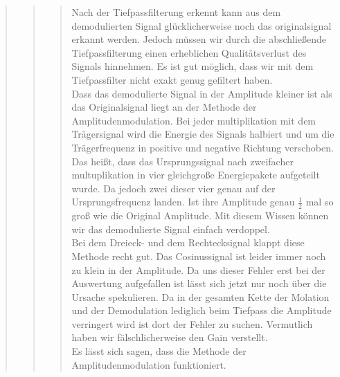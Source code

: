 \begin{quote}
\begin{quote}
\begin{quote}
                    Nach der Tiefpassfilterung erkennt kann aus dem demodulierten Signal glücklicherweise noch das
                    originalsignal erkannt werden. Jedoch müssen wir durch die abschließende Tiefpassfilterung einen
                    erheblichen Qualitätsverlust des Signals hinnehmen. Es ist gut möglich, dass wir mit dem
                    Tiefpassfilter nicht exakt genug gefiltert haben.\\
                    Dass das demodulierte Signal in der Amplitude kleiner ist als das Originalsignal liegt an der
                    Methode der Amplitudenmodulation. Bei jeder multiplikation mit dem Trägersignal wird die Energie des
                    Signals halbiert und um die Trägerfrequenz in positive und negative Richtung verschoben. Das heißt,
                    dass das Ursprungssignal nach zweifacher multuplikation in vier gleichgroße Energiepakete aufgeteilt
                    wurde. Da jedoch zwei dieser vier genau auf der Ursprungsfrequenz landen. Ist ihre Amplitude genau
                    $\frac{1}{2}$ mal so groß wie die Original Amplitude. Mit diesem Wissen können wir das demodulierte
                    Signal einfach verdoppel.\\
                    Bei dem Dreieck- und dem Rechtecksignal klappt diese Methode recht gut.  Das Cosinussignal ist
                    leider immer noch zu klein in der Amplitude. Da uns dieser Fehler erst bei der Auswertung
                    aufgefallen ist lässt sich jetzt nur noch über die Ursache spekulieren. Da in der gesamten
                    Kette der Molation und der Demodulation lediglich beim Tiefpass die Amplitude verringert
                    wird ist dort der Fehler zu suchen. Vermutlich haben wir fälschlicherweise den Gain
                    verstellt.\\
                    
                    Es lässt sich sagen, dass die Methode der Amplitudenmodulation funktioniert.
                    		
		\end{quote}
    \end{quote}
\end{quote}




